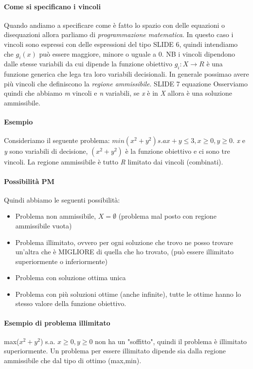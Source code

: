 \documentclass[12pt, a4paper, openany]{book}
\begin{document}
\paragraph*{Come si specificano i vincoli} Quando andiamo a specificare come è fatto lo spazio con delle equazioni o disequazioni allora parliamo di \emph{programmazione matematica}.
In questo caso i vincoli sono espressi con delle espressioni del tipo {SLIDE 6}, quindi intendiamo che $g_i(x)$ può essere maggiore, minore o uguale a 0. NB i vincoli dipendono dalle stesse variabili da cui dipende la funzione obiettivo 
$g_i :X\to R$ è una funzione generica che lega tra loro variabili decisionali. In generale possimao avere più vincoli che definiscono la \emph{regione ammissibile}.
{SLIDE 7 equazione} Osserviamo quindi che abbiamo \emph{m} vincoli e \emph{n} variabili, se \emph{x} è in \emph{X} allora è una soluzione ammissibile.
\paragraph*{Esempio} Consideriamo il seguente problema: $min (x^2+y^2) s.a x+y\leq 3, x\geq 0, y\geq0$. 
\emph{x} e \emph{y} sono variabili di decisione, $(x^2+y^2)$ è la funzione obiettivo e ci sono tre vincoli. La regione ammissibile è tutto \emph{R} limitato dai vincoli (combinati).
\paragraph*{Possibilità PM} Quindi abbiamo le seguenti possibilità:
\begin{itemize}
    \item Problema non ammissibile, $X = \emptyset$ (problema mal posto con regione ammissibile vuota)
    \item Problema illimitato, ovvero per ogni soluzione che trovo ne posso trovare un'altra che è MIGLIORE di quella che ho trovato, (può essere illimitato superiormente o inferiormente)
    \item Problema con soluzione ottima unica
    \item Problema con più soluzioni ottime (anche infinite), tutte le ottime hanno lo stesso valore della funzione obiettivo.
\end{itemize}
\paragraph*{Esempio di problema illimitato} max($x^2+y^2$) s.a. $x\geq 0,y\geq 0$ non ha un "soffitto", quindi il problema è illimitato superiormente. Un problema per essere illimitato dipende sia dalla regione ammissibile che dal tipo di ottimo (max,min).
\end{document}
